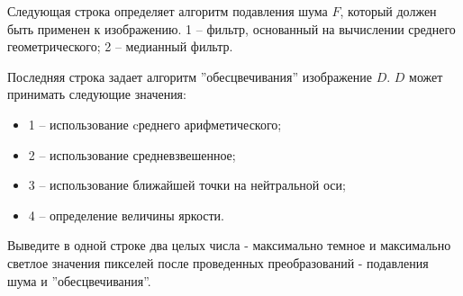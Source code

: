 Следующая строка определяет алгоритм подавления шума $F$, который должен быть применен к изображению. 
{1 -- фильтр, основанный на вычислении среднего геометрического;}
{2 -- медианный фильтр.}

Последняя строка задает алгоритм ''обесцвечивания'' изображение $D$. 
$D$ может принимать следующие значения:
\begin{itemize}
  \item 1 -- использование cреднего арифметического;
  \item 2 -- использование средневзвешенное;
  \item 3 -- использование ближайшей точки на нейтральной оси;
  \item 4 -- определение величины яркости.
\end{itemize}

\outputfmtSection

Выведите в одной строке два целых числа - максимально темное и максимально светлое значения пикселей после проведенных преобразований - подавления шума и ''обесцвечивания''. 

\exampleSection


